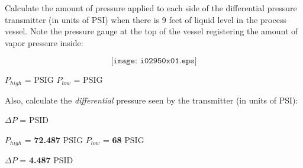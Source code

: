 

Calculate the amount of pressure applied to each side of the differential pressure transmitter (in units of PSI) when there is 9 feet of liquid level in the process vessel.  Note the pressure gauge at the top of the vessel registering the amount of vapor pressure inside:

$$\texttt{[image: i02950x01.eps]}$$

\vskip 10pt

$P_{high}$ = \underbar{\hskip 50pt} PSIG \hskip 100pt $P_{low}$ = \underbar{\hskip 50pt} PSIG

\vskip 10pt

Also, calculate the {\it differential} pressure seen by the transmitter (in units of PSI):

\vskip 10pt

$\Delta P$ = \underbar{\hskip 50pt} PSID

\vskip 10pt







$P_{high}$ = {\bf 72.487} PSIG \hskip 100pt $P_{low}$ = {\bf 68} PSIG

\vskip 10pt

$\Delta P$ = {\bf 4.487} PSID










